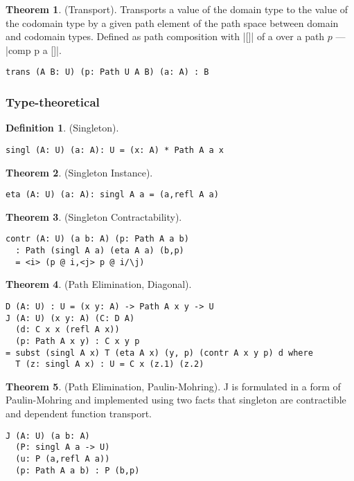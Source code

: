 \documentclass{article}
\theoremstyle{definition}
\newtheorem{theorem}{Theorem}
\newtheorem{definition}{Definition}
\begin{document}
\begin{theorem} (Transport).
Transports a value of the domain type to the value of the codomain type
by a given path element of the path space between domain and codomain types.
Defined as path composition with |[]| of a over a path $p$ --- |comp p a []|.
\begin{lstlisting}
trans (A B: U) (p: Path U A B) (a: A) : B
\end{lstlisting}
\end{theorem}

\subsubsection{Type-theoretical}
\begin{definition} (Singleton).
\begin{lstlisting}
singl (A: U) (a: A): U = (x: A) * Path A a x
\end{lstlisting}
\end{definition}

\begin{theorem} (Singleton Instance).
\begin{lstlisting}
eta (A: U) (a: A): singl A a = (a,refl A a)
\end{lstlisting}
\end{theorem}

\begin{theorem} (Singleton Contractability).
\begin{lstlisting}
contr (A: U) (a b: A) (p: Path A a b)
  : Path (singl A a) (eta A a) (b,p)
  = <i> (p @ i,<j> p @ i/\j)
\end{lstlisting}
\end{theorem}

\begin{theorem} (Path Elimination, Diagonal).
\begin{lstlisting}
D (A: U) : U = (x y: A) -> Path A x y -> U
J (A: U) (x y: A) (C: D A)
  (d: C x x (refl A x))
  (p: Path A x y) : C x y p
= subst (singl A x) T (eta A x) (y, p) (contr A x y p) d where
  T (z: singl A x) : U = C x (z.1) (z.2)
\end{lstlisting}
\end{theorem}

\begin{theorem} (Path Elimination, Paulin-Mohring).
J is formulated in a form of Paulin-Mohring and implemented using
two facts that singleton are contractible and dependent function
transport.
\begin{lstlisting}
J (A: U) (a b: A)
  (P: singl A a -> U)
  (u: P (a,refl A a))
  (p: Path A a b) : P (b,p)
\end{lstlisting}
\end{theorem}
\end{document}
